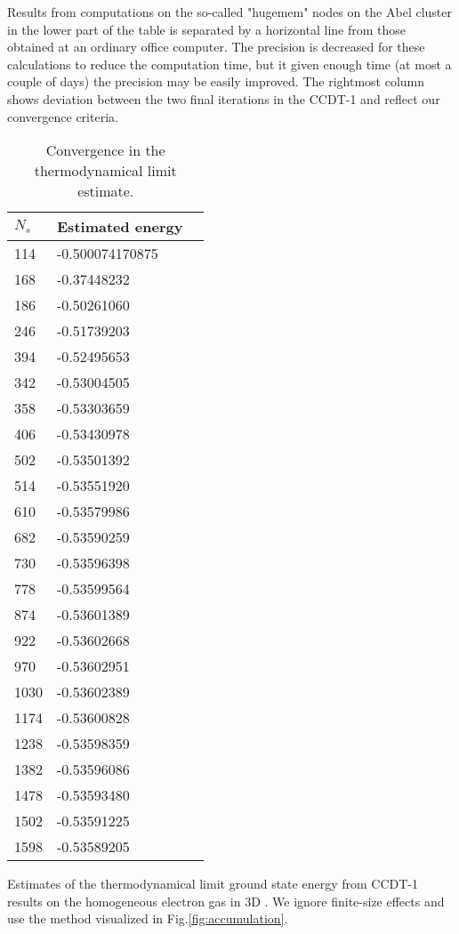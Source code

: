 \begin{table}[hbpt]
\begin{center}
\begin{threeparttable}
\begin{tablenotes}
Results from computations on the so-called "hugemem" nodes on the Abel
cluster in the lower part of the table is separated by a horizontal
line from those obtained at an ordinary office computer. The precision
is decreased for these calculations to reduce the computation time,
but it given enough time (at most a couple of days) the precision may
be easily improved. The rightmost column shows deviation between the
two final iterations in the CCDT-1 and reflect our convergence
criteria.
\end{tablenotes}
\end{threeparttable}
\end{center}
\label{tab:extrap_large}
\end{table}

\begin{table}[h]
\caption{Convergence in the thermodynamical limit estimate.}
\begin{center}
\begin{threeparttable}
\begin{tabular}{l l l}
    \toprule
$N_s$ & Estimated energy \\ \hline
114&-0.500074170875 \\
168&-0.37448232\\
186&-0.50261060\\
246& -0.51739203\\
394&-0.52495653\\
342&-0.53004505\\
358&-0.53303659\\
406&-0.53430978\\
502&-0.53501392\\
514&-0.53551920\\
610&-0.53579986\\
682&-0.53590259\\
730&-0.53596398\\
778&-0.53599564\\
874&-0.53601389\\
922&-0.53602668\\
970&-0.53602951\\
1030&-0.53602389\\
1174&-0.53600828\\
1238&-0.53598359\\
1382&-0.53596086\\
1478&-0.53593480\\
1502&-0.53591225\\
1598&-0.53589205\\
\bottomrule
\end{tabular}
\begin{tablenotes}
Estimates of the thermodynamical limit ground state energy from CCDT-1 results on the homogeneous electron gas in 3D . We ignore finite-size effects and use the method visualized in Fig.\ref{fig:accumulation}. 
\end{tablenotes}
\end{threeparttable}
\end{center}
\label{tab:extrap_convergence}
\end{table}

